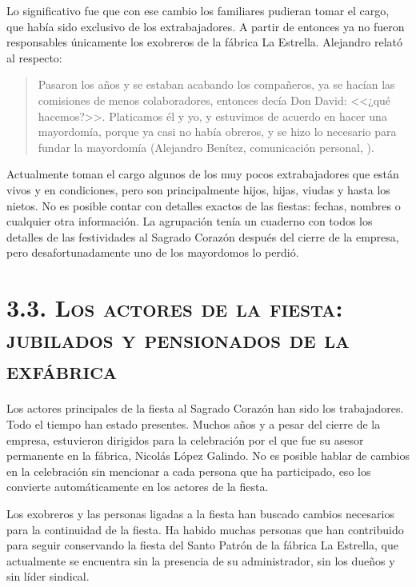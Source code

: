 \documentclass[14pt,letterpaper,twoside]{extbook} %
\begin{document}
Lo significativo fue que con ese cambio los familiares pudieran tomar el cargo, que había sido exclusivo de los extrabajadores. A partir de entonces ya no fueron responsables únicamente los exobreros de la fábrica La Estrella. Alejandro relató al respecto:

\begin{quotation}
\noindent Pasaron los años y se estaban acabando los compañeros, ya se hacían las comisiones de menos colaboradores, entonces decía Don David: <<¿qué hacemos?>>. Platicamos él y yo, y estuvimos de acuerdo en hacer una mayordomía, porque ya casi no había obreros, y se hizo lo necesario para fundar la mayordomía (Alejandro Benítez, comunicación personal, ).
\end{quotation}

\noindent Actualmente toman el cargo algunos de los muy pocos extrabajadores que están vivos y en condiciones, pero son principalmente hijos, hijas, viudas y hasta los nietos. No es posible contar con detalles exactos de las fiestas: fechas, nombres o cualquier otra información. La
agrupación tenía un cuaderno con todos los detalles de las festividades al Sagrado Corazón después del cierre de la empresa, pero desafortunadamente uno de los mayordomos lo perdió.

\section*{\mdseries\large\textsc{3.3. Los actores de la fiesta: jubilados y pensionados de la exfábrica}}

\noindent Los actores principales de la fiesta al Sagrado Corazón han sido los trabajadores. Todo el tiempo han estado presentes. Muchos años y a pesar del cierre de la empresa, estuvieron dirigidos para la celebración por el que fue su asesor permanente en la fábrica, Nicolás López
Galindo. No es posible hablar de cambios en la celebración sin mencionar a cada persona que ha participado, eso los convierte automáticamente en los actores de la fiesta.

Los exobreros y las personas ligadas a la fiesta han buscado cambios necesarios para la continuidad de la fiesta. Ha habido muchas personas que han contribuido para seguir conservando la fiesta del Santo Patrón de la fábrica La Estrella, que actualmente se encuentra sin la presencia de su administrador, sin los dueños y sin líder sindical.
\end{document}
